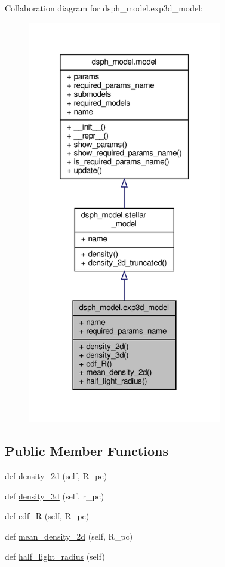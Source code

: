 Collaboration diagram for dsph\+\_\+model.\+exp3d\+\_\+model\+:\nopagebreak
\begin{figure}[H]
\begin{center}
\leavevmode
\includegraphics[width=241pt]{d3/dcd/classdsph__model_1_1exp3d__model__coll__graph}
\end{center}
\end{figure}
\subsection*{Public Member Functions}
\begin{DoxyCompactItemize}
\item 
def \hyperlink{classdsph__model_1_1exp3d__model_ab510e347adc62697068885282a6f477a}{density\+\_\+2d} (self, R\+\_\+pc)
\item 
def \hyperlink{classdsph__model_1_1exp3d__model_ae31f24dee429dda1409429bf62fea05d}{density\+\_\+3d} (self, r\+\_\+pc)
\item 
def \hyperlink{classdsph__model_1_1exp3d__model_a5720f3c3c46a00563c388a4f70daba0e}{cdf\+\_\+R} (self, R\+\_\+pc)
\item 
def \hyperlink{classdsph__model_1_1exp3d__model_a0dae92e16b158e09e47517706236f83d}{mean\+\_\+density\+\_\+2d} (self, R\+\_\+pc)
\item 
def \hyperlink{classdsph__model_1_1exp3d__model_a7f12e007771f65a024fc044331eb2f62}{half\+\_\+light\+\_\+radius} (self)
\end{DoxyCompactItemize}

